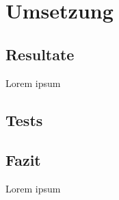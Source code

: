 
\section{Umsetzung}

\subsection{Resultate}
Lorem ipsum
\clearpage

\subsection{Tests}



\subsection{Fazit}
Lorem ipsum
\clearpage
